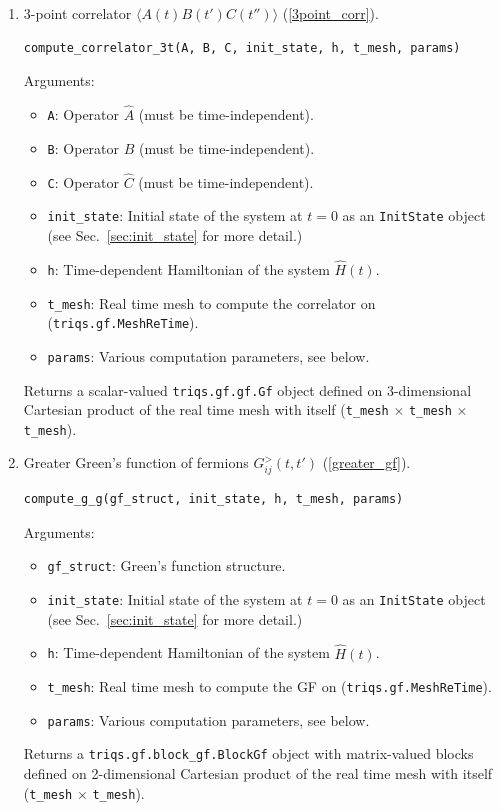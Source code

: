 \documentclass[]{article}
\newcommand{\aver}[1]{\ensuremath{\langle#1\rangle}}
\begin{document}
\begin{enumerate}
    \item 3-point correlator $\aver{A(t) B(t') C(t'')}$ (\ref{3point_corr}).
    \begin{lstlisting}[language=Python]
        compute_correlator_3t(A, B, C, init_state, h, t_mesh, params)
    \end{lstlisting}
    Arguments:
    \begin{itemize}
        \item \texttt{A}: Operator $\hat{A}$ (must be time-independent).
        \item \texttt{B}: Operator $\hat{B}$ (must be time-independent).
        \item \texttt{C}: Operator $\hat{C}$ (must be time-independent).
        \item \texttt{init\_state}: Initial state of the system at $t=0$ as an \texttt{InitState} object (see Sec.~\ref{sec:init_state} for more detail.)
        \item \texttt{h}: Time-dependent Hamiltonian of the system $\hat H(t)$.
        \item \texttt{t\_mesh}: Real time mesh to compute the correlator on (\texttt{triqs.gf.MeshReTime}).
        \item \texttt{params}: Various computation parameters, see below.
    \end{itemize}
    Returns a scalar-valued \texttt{triqs.gf.gf.Gf} object defined on 3-dimensional Cartesian product of the real time mesh with itself (\texttt{t\_mesh} $\times$ \texttt{t\_mesh} $\times$ \texttt{t\_mesh}).
    
    \item Greater Green's function of fermions $G^>_{ij}(t,t')$ (\ref{greater_gf}).
    \begin{lstlisting}[language=Python]
        compute_g_g(gf_struct, init_state, h, t_mesh, params)
    \end{lstlisting}
    Arguments:
    \begin{itemize}
        \item \texttt{gf\_struct}: Green's function structure.
        \item \texttt{init\_state}: Initial state of the system at $t=0$ as an \texttt{InitState} object (see Sec.~\ref{sec:init_state} for more detail.)
        \item \texttt{h}: Time-dependent Hamiltonian of the system $\hat H(t)$.
        \item \texttt{t\_mesh}: Real time mesh to compute the GF on (\texttt{triqs.gf.MeshReTime}).
        \item \texttt{params}: Various computation parameters, see below.
    \end{itemize}
    Returns a \texttt{triqs.gf.block\_gf.BlockGf} object with matrix-valued blocks defined on 2-dimensional Cartesian product of the real time mesh with itself (\texttt{t\_mesh} $\times$ \texttt{t\_mesh}).


\end{enumerate}
\end{document}
